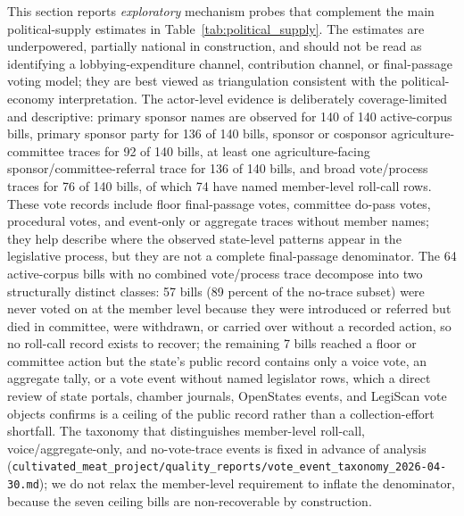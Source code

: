 \documentclass[12pt]{article}
\begin{document}
This section reports \emph{exploratory} mechanism probes that complement the main political-supply estimates in Table~\ref{tab:political_supply}.  The estimates are underpowered, partially national in construction, and should not be read as identifying a lobbying-expenditure channel, contribution channel, or final-passage voting model; they are best viewed as triangulation consistent with the political-economy interpretation.  The actor-level evidence is deliberately coverage-limited and descriptive: primary sponsor names are observed for 140 of 140 active-corpus bills, primary sponsor party for 136 of 140 bills, sponsor or cosponsor agriculture-committee traces for 92 of 140 bills, at least one agriculture-facing sponsor/committee-referral trace for 136 of 140 bills, and broad vote/process traces for 76 of 140 bills, of which 74 have named member-level roll-call rows.  These vote records include floor final-passage votes, committee do-pass votes, procedural votes, and event-only or aggregate traces without member names; they help describe where the observed state-level patterns appear in the legislative process, but they are not a complete final-passage denominator.  The 64 active-corpus bills with no combined vote/process trace decompose into two structurally distinct classes: 57 bills (89 percent of the no-trace subset) were never voted on at the member level because they were introduced or referred but died in committee, were withdrawn, or carried over without a recorded action, so no roll-call record exists to recover; the remaining 7 bills reached a floor or committee action but the state's public record contains only a voice vote, an aggregate tally, or a vote event without named legislator rows, which a direct review of state portals, chamber journals, OpenStates events, and LegiScan vote objects confirms is a ceiling of the public record rather than a collection-effort shortfall.  The taxonomy that distinguishes member-level roll-call, voice/aggregate-only, and no-vote-trace events is fixed in advance of analysis (\texttt{cultivated\_meat\_project/quality\_reports/vote\_event\_taxonomy\_2026-04-30.md}); we do not relax the member-level requirement to inflate the denominator, because the seven ceiling bills are non-recoverable by construction.
\end{document}
